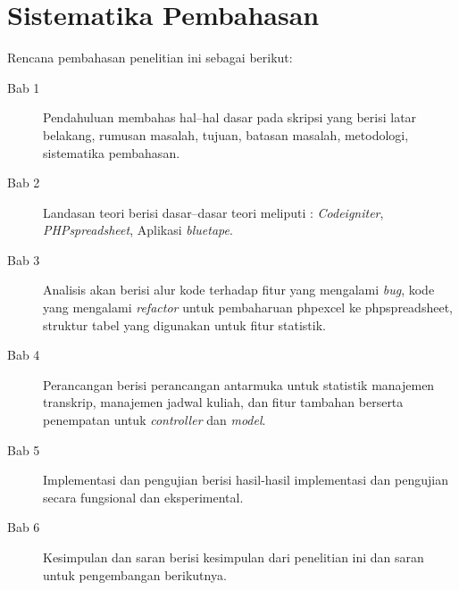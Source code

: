 \section{Sistematika Pembahasan}
\label{sec:sispem}
Rencana pembahasan penelitian ini sebagai berikut:
\begin{description}
	\item[Bab 1] Pendahuluan membahas hal--hal dasar pada skripsi yang berisi latar belakang, rumusan masalah, tujuan, batasan masalah, metodologi, sistematika pembahasan.
	\item[Bab 2] Landasan teori berisi dasar--dasar teori meliputi : \textit{Codeigniter}, \textit{PHPspreadsheet}, Aplikasi \textit{bluetape}.
	\item[Bab 3] Analisis akan berisi alur kode terhadap fitur yang mengalami \textit{bug}, kode yang mengalami \textit{refactor} untuk pembaharuan phpexcel ke phpspreadsheet, struktur tabel yang digunakan untuk fitur statistik.
	\item[Bab 4] Perancangan berisi perancangan antarmuka untuk statistik manajemen transkrip, manajemen jadwal kuliah, dan fitur tambahan berserta penempatan untuk \textit{controller} dan \textit{model}.  
	\item[Bab 5] Implementasi dan pengujian berisi hasil-hasil implementasi dan pengujian secara fungsional dan eksperimental.
	\item[Bab 6] Kesimpulan dan saran berisi kesimpulan dari penelitian ini dan saran untuk pengembangan berikutnya.
\end{description}
